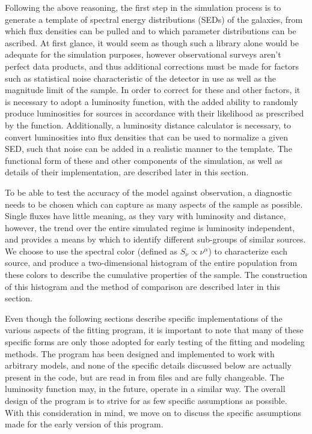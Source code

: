 \documentclass[twocolumn,letterpaper,10pt]{article}
\begin{document}
Following the above reasoning, the first step in the simulation process is to generate a template of spectral energy distributions (SEDs) of the galaxies, from which flux densities can be pulled and to which parameter distributions can be ascribed. At first glance, it would seem as though such a library alone would be adequate for the simulation purposes, however observational surveys aren't perfect data products, and thus additional corrections must be made for factors such as statistical noise characteristic of the detector in use as well as the magnitude limit of the sample. In order to correct for these and other factors, it is necessary to adopt a luminosity function, with the added ability to randomly produce luminosities for sources in accordance with their likelihood as prescribed by the function. Additionally, a luminosity distance calculator is necessary, to convert luminosities into flux densities that can be used to normalize a given SED, such that noise can be added in a realistic manner to the template. The functional form of these and other components of the simulation, as well as details of their implementation, are described later in this section.

To be able to test the accuracy of the model against observation, a diagnostic needs to be chosen which can capture as many aspects of the sample as possible. Single fluxes have little meaning, as they vary with luminosity and distance, however, the trend over the entire simulated regime is luminosity independent, and provides a means by which to identify different sub-groups of similar sources. We choose to use the spectral color (defined as $S_\nu\propto\nu^\alpha$) to characterize each source, and produce a two-dimensional histogram of the entire population from these colors to describe the cumulative properties of the sample. The construction of this histogram and the method of comparison are described later in this section.

Even though the following sections describe specific implementations of the various aspects of the fitting program, it is important to note that many of these specific forms are only those adopted for early testing of the fitting and modeling methods. The program has been designed and implemented to work with arbitrary models, and none of the specific details discussed below are actually present in the code, but are read in from files and are fully changeable. The luminosity function may, in the future, operate in a similar way. The overall design of the program is to strive for as few specific assumptions as possible. With this consideration in mind, we move on to discuss the specific assumptions made for the early version of this program.
\end{document}
